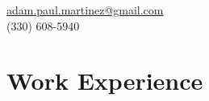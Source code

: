 \documentclass[letterpaper,11pt]{article} %
\begin{document}
\pagestyle{empty} %


\par{\medskip\par} %

\begin{center}
\href{mailto:adam.paul.martinez@gmail.com}{adam.paul.martinez@gmail.com} \\
(330) 608-5940
\end{center}


\section{Work Experience}
\end{document}
